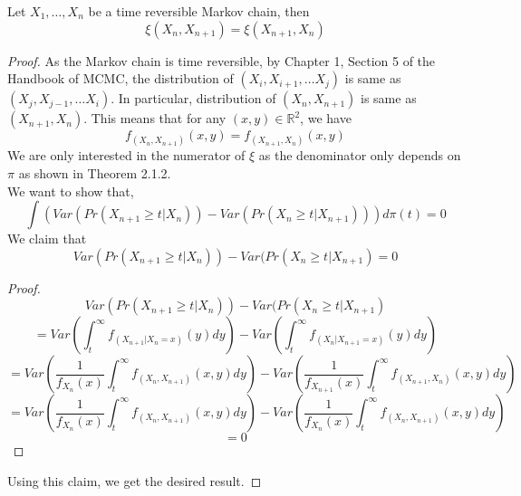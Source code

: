 \begin{theorem}
	Let $X_1, \dots, X_n$ be a time reversible Markov chain, then
	$$\xi(X_n, X_{n+1}) = \xi(X_{n+1}, X_n)$$

	\begin{proof}
		As the Markov chain is time reversible, by Chapter 1, Section 5 of the Handbook of MCMC,
		the distribution of $(X_i, X_{i+1}, \dots X_j)$ is same as $(X_j, X_{j-1}, \dots X_i)$. In particular,
		distribution of $(X_n, X_{n+1})$ is same as $(X_{n+1}, X_n)$.
		This means that for any $(x, y) \in \mathbb{R}^2$, we have
		\begin{equation*}
			f_{(X_n, X_{n+1})}(x, y) = f_{(X_{n+1}, X_n)}(x, y)
		\end{equation*}
		We are only interested in the numerator of $\xi$ as the denominator only depends on $\pi$ as shown in Theorem 2.1.2.\\
		We want to show that,
		\begin{equation*}
			\int (Var(Pr(X_{n+1} \geq t | X_n)) - Var(Pr(X_n \geq t | X_{n+1})) )d\pi(t) = 0
		\end{equation*}
		We claim that
		\begin{equation*}
			Var(Pr(X_{n+1} \geq t | X_n)) - Var(Pr(X_n \geq t | X_{n+1}) = 0
		\end{equation*}
		\begin{proof}
			$$Var(Pr(X_{n+1} \geq t | X_n)) - Var(Pr(X_n \geq t | X_{n+1})$$
			$$= Var(\int_t^{\infty} f_{(X_{n+1}|X_n=x)}(y)dy) - Var(\int_t^{\infty} f_{(X_{n}|X_{n+1}=x)}(y)dy)$$
			$$= Var(\frac{1}{f_{X_n}(x)} \int_t^{\infty} f_{(X_n, X_{n+1})}(x, y)dy) - Var(\frac{1}{f_{X_{n+1}}(x)} \int_t^{\infty} f_{(X_{n+1}, X_n)}(x, y)dy)$$
			$$= Var(\frac{1}{f_{X_n}(x)} \int_t^{\infty} f_{(X_n, X_{n+1})}(x, y)dy) - Var(\frac{1}{f_{X_{n}}(x)} \int_t^{\infty} f_{(X_{n}, X_{n+1})}(x, y)dy)$$
			$$= 0$$
		\end{proof}
		Using this claim, we get the desired result.
	\end{proof}
\end{theorem}